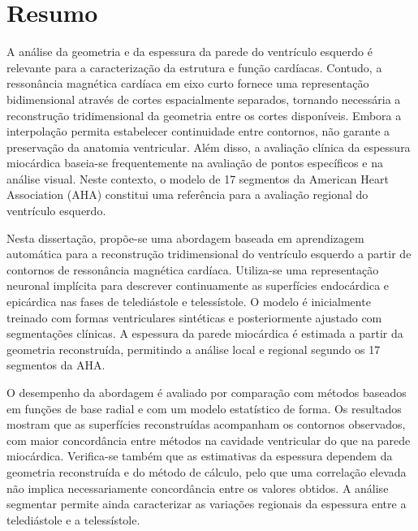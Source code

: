 
\chapter*{Resumo}

\noindent
A análise da geometria e da espessura da parede do ventrículo esquerdo
é relevante para a caracterização da estrutura e função cardíacas.
Contudo, a ressonância magnética cardíaca em eixo curto fornece
uma representação bidimensional através de cortes espacialmente
separados, tornando necessária a reconstrução tridimensional da
geometria entre os cortes disponíveis. Embora a interpolação permita
estabelecer continuidade entre contornos, não garante a preservação
da anatomia ventricular. Além disso, a avaliação clínica da espessura
miocárdica baseia-se frequentemente na avaliação de pontos específicos e na
análise visual. Neste contexto, o modelo de 17 segmentos da American
Heart Association (AHA) constitui uma referência para a avaliação
regional do ventrículo esquerdo.

Nesta dissertação, propõe-se uma abordagem baseada em aprendizagem
automática para a reconstrução tridimensional do ventrículo esquerdo
a partir de contornos de ressonância magnética cardíaca. Utiliza-se
uma representação neuronal implícita para descrever continuamente
as superfícies endocárdica e epicárdica nas fases de telediástole
e telessístole. O modelo é inicialmente treinado com formas
ventriculares sintéticas e posteriormente ajustado com segmentações
clínicas. A espessura da parede miocárdica é estimada a partir da
geometria reconstruída, permitindo a análise local e regional segundo
os 17 segmentos da AHA.

O desempenho da abordagem é avaliado por comparação com métodos
baseados em funções de base radial e com um modelo estatístico
de forma. Os resultados mostram que as superfícies reconstruídas
acompanham os contornos observados, com maior concordância entre
métodos na cavidade ventricular do que na parede miocárdica.
Verifica-se também que as estimativas da espessura dependem da
geometria reconstruída e do método de cálculo, pelo que uma correlação
elevada não implica necessariamente concordância entre os valores obtidos.
A análise segmentar permite ainda caracterizar as variações regionais
da espessura entre a telediástole e a telessístole.

